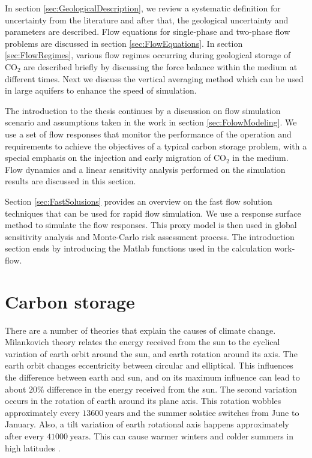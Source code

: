 In section \ref{sec:GeologicalDescription}, we review a systematic definition
for uncertainty from the literature and after that, the geological uncertainty
and parameters are described. Flow equations for single-phase and two-phase flow
problems are discussed in section \ref{sec:FlowEquations}. In section
\ref{sec:FlowRegimes}, various flow regimes occurring during geological storage
of $\mbox{CO}_2$ are described briefly by discussing the force balance within
the medium at different times. Next we discuss the vertical averaging method
which can be used in large aquifers to enhance the speed of simulation.

The introduction to the thesis continues by a discussion on flow simulation
scenario and assumptions taken in the work in section \ref{sec:FolowModeling}.
We use a set of flow responses that monitor the performance of the operation and
requirements to achieve the objectives of a typical carbon storage problem, with
a special emphasis on the injection and early migration of $\mbox{CO}_2$ in the
medium. Flow dynamics and a linear sensitivity analysis performed on the
simulation results are discussed in this section. 

Section \ref{sec:FastSolusions} provides an overview on the fast flow solution
techniques that can be used for rapid flow simulation. We use a response surface
method to simulate the flow responses. This proxy model is then used in global
sensitivity analysis and Monte-Carlo risk assessment process. The introduction
section ends by introducing the Matlab functions used in the calculation
work-flow. 

\section{Carbon storage}
\label{sec:CarbonStorage}
There are a number of theories that explain the causes of climate change.
Milankovich theory \cite{foukal2006variations} relates the energy received from
the sun to the  cyclical variation of earth orbit around the sun, and earth
rotation around its axis. The earth orbit changes eccentricity between circular
and elliptical. This influences the difference between earth and sun, and on its
maximum influence can lead to about $20\%$ difference in the energy received
from the sun. The second variation occurs in the rotation of earth around its
plane axis. This rotation wobbles approximately every $13600~\mbox{years}$ and
the summer solstice switches from June to January. Also, a tilt variation of
earth rotational axis happens approximately after every $41000~\mbox{years}$.
This can cause warmer winters and colder summers in high latitudes
\cite{foukal2006variations}. 


